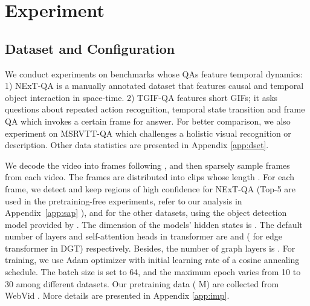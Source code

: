 \documentclass[runningheads]{llncs}
\begin{document}
\section{Experiment}
\subsection{Dataset and Configuration}
We conduct experiments on benchmarks whose QAs feature temporal dynamics: 1) NExT-QA \cite{xiao2021next} is a manually annotated dataset that features causal and temporal object interaction in space-time. 2) TGIF-QA \cite{jang2017tgif} features short GIFs; it asks questions about repeated action recognition, temporal state transition and frame QA which invokes a certain frame for answer. For better comparison, we also experiment on MSRVTT-QA \cite{xu2017video} which challenges a holistic visual recognition or description. Other data statistics are presented in Appendix \ref{app:dset}.

We decode the video into frames following \cite{xiao2021video}, and then sparsely sample  frames from each video. The frames are distributed into  clips whose length .
For each frame, we detect and keep  regions of high confidence for NExT-QA (Top-5 are used in the pretraining-free experiments, refer to our analysis in Appendix~\ref{app:sap}
), and  for the other datasets, using the object detection model provided by \cite{anderson2018bottom}. The dimension of the models' hidden states is . The default number of layers and self-attention heads in transformer are  and  ( for edge transformer in DGT) respectively. Besides, the number of graph layers is . For training, 
we use Adam optimizer with initial learning rate  of a cosine annealing schedule. The batch size is set to 64, and the maximum epoch varies from 10 to 30 among different datasets. Our pretraining data ( M) are collected from WebVid \cite{bain2021frozen}. More details are presented in Appendix \ref{app:imp}.
\end{document}
